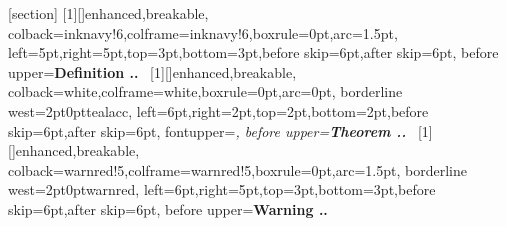 
\usepackage[a4paper,margin=2.0cm]{geometry}
\usepackage{newpxtext,newpxmath}
\usepackage[T1]{fontenc}
\usepackage{xcolor}
\usepackage[most]{tcolorbox}
\usepackage{etoolbox}
\usepackage{titlesec}
\titleformat{\section}{\large\bfseries\sffamily\color{inknavy}}{\thesection}{0.6em}{}
\titlespacing*{\section}{0pt}{1.1em}{0.4em}

[section]
\renewcommand{\thethmc}{\thesection.\arabic{thmc}}
[1][]{enhanced,breakable,
  colback=inknavy!6,colframe=inknavy!6,boxrule=0pt,arc=1.5pt,
  left=5pt,right=5pt,top=3pt,bottom=3pt,before skip=6pt,after skip=6pt,
  before upper={\textbf{\color{inknavy}Definition \thesection.}\textbf{.}\ }}
[1][]{enhanced,breakable,
  colback=white,colframe=white,boxrule=0pt,arc=0pt,
  borderline west={2pt}{0pt}{tealacc},
  left=6pt,right=2pt,top=2pt,bottom=2pt,before skip=6pt,after skip=6pt,
  fontupper=\itshape,
  before upper={\upshape\textbf{\color{tealacc}Theorem \thesection.}\textbf{.}\ }}
[1][]{enhanced,breakable,
  colback=warnred!5,colframe=warnred!5,boxrule=0pt,arc=1.5pt,
  borderline west={2pt}{0pt}{warnred},
  left=6pt,right=5pt,top=3pt,bottom=3pt,before skip=6pt,after skip=6pt,
  before upper={\textbf{\color{warnred}Warning \thesection.}\textbf{.}\ }}
\renewcommand{\thethmc}{\thesection.\arabic{thmc}}
\theoremstyle{plainpx}
\newtheorem{prop}[thmc]{Proposition}
\theoremstyle{uppx}
\newtheorem{example}[thmc]{Example}
\newtheorem{remark}[thmc]{Remark}

\newcommand{\WalkthroughHeader}[5]{%
  \begin{tcolorbox}[colback=inknavy!4,colframe=inknavy!4,arc=2pt,boxrule=0pt,
    left=7pt,right=7pt,top=5pt,bottom=5pt]
    {\Large\bfseries\sffamily\color{inknavy}#3}\par\smallskip
    {\sffamily #1 \;\textbar\; #2 \;\textbar\; #4}\par
    {\small Sources: #5}
  \end{tcolorbox}\medskip}
